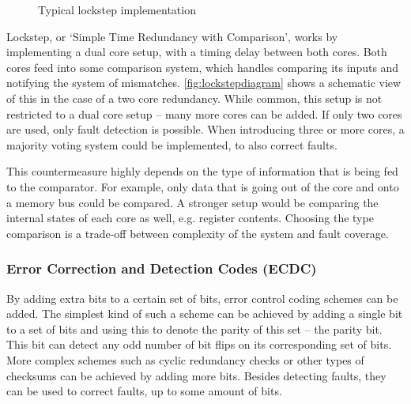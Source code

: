 \documentclass[10pt]{article}
\begin{document}
    \begin{figure}[H]
      \centering
      \def\svgwidth{\columnwidth}
      
      \caption{Typical lockstep implementation}
      \label{fig:lockstepdiagram}
    \end{figure}

    Lockstep, or `Simple Time Redundancy with Comparison', \cite{bar-el_sorcerers_2006} works by implementing a dual core setup, with a timing delay between both cores. Both cores feed into some comparison system, which handles comparing its inputs and notifying the system of mismatches. \autoref{fig:lockstepdiagram} shows a  schematic view of this in the case of a two core redundancy. While common, this setup is not restricted to a dual core setup -- many more cores can be added. If only two cores are used, only fault detection is possible. When introducing three or more cores, a majority voting system could be implemented, to also correct faults.

    This countermeasure highly depends on the type of information that is being fed to the comparator. For example, only data that is going out of the core and onto a memory bus could be compared. A stronger setup would be comparing the internal states of each core as well, e.g. register contents. Choosing the type comparison is a trade-off between complexity of the system and fault coverage.

    \subsubsection{Error Correction and Detection Codes (ECDC) }

    By adding extra bits to a certain set of bits, error control coding schemes can be added. The simplest kind of such a scheme can be achieved by adding a single bit to a set of bits and using this to denote the parity of this set -- the parity bit. This bit can detect any odd number of bit flips on its corresponding set of bits. More complex schemes such as cyclic redundancy checks or other types of checksums can be achieved by adding more bits. Besides detecting faults, they can be used to correct faults, up to some amount of bits. \cite{lin_error_2004} 

\newpage
\end{document}
